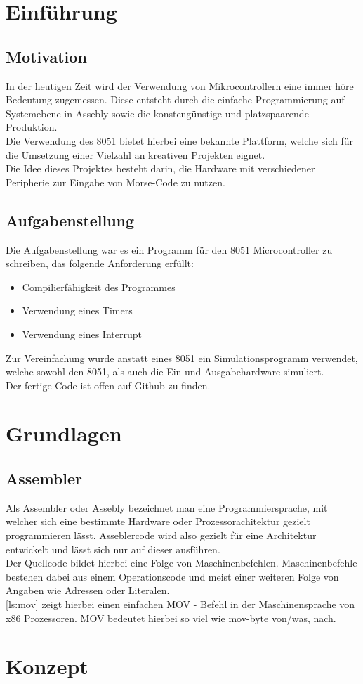 \documentclass[a4paper,12pt]{article}
\begin{document}
	\section{Einführung}
	\subsection{Motivation}
	In der heutigen Zeit wird der Verwendung von Mikrocontrollern eine immer höre Bedeutung zugemessen. Diese entsteht durch die einfache Programmierung auf Systemebene in Assebly sowie die konstengünstige und platzspaarende Produktion.\\
	Die Verwendung des 8051  bietet hierbei eine bekannte Plattform, welche sich für die Umsetzung einer Vielzahl an kreativen Projekten eignet.\\
	Die Idee dieses Projektes besteht darin, die Hardware mit verschiedener Peripherie zur Eingabe von Morse-Code zu nutzen.\\
	\subsection{Aufgabenstellung}
	Die Aufgabenstellung war es ein Programm für den 8051 Microcontroller zu schreiben, das folgende Anforderung erfüllt:
	\begin{itemize}
		\item Compilierfähigkeit des Programmes
		\item Verwendung eines Timers
		\item Verwendung eines Interrupt
	\end{itemize}
	Zur Vereinfachung wurde anstatt eines 8051 ein Simulationsprogramm verwendet, welche sowohl den 8051, als auch die Ein und Ausgabehardware simuliert.\\
	Der fertige Code ist offen auf Github zu finden.
	
	\newpage
	
	\section{Grundlagen}
	\subsection{Assembler}
	Als Assembler oder Assebly bezeichnet man eine Programmiersprache, mit welcher sich eine bestimmte Hardware oder Prozessorachitektur gezielt programmieren lässt. Asseblercode wird also gezielt für eine Architektur entwickelt und lässt sich nur auf dieser ausführen.\\
	Der Quellcode bildet hierbei eine Folge von Maschinenbefehlen. Maschinenbefehle bestehen dabei aus einem Operationscode und meist einer weiteren Folge von Angaben wie Adressen oder Literalen.\\
	\ref{ls:mov} zeigt hierbei einen einfachen MOV - Befehl in  der Maschinensprache von x86 Prozessoren. MOV bedeutet hierbei so viel wie mov-byte von/was, nach.\\
	
	\newpage
	
	\section{Konzept}
\end{document}
